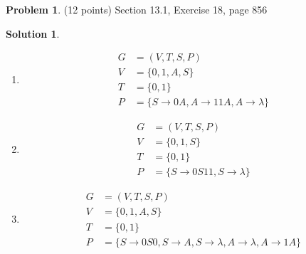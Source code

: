 \documentclass{article}
\theoremstyle{definition}
\newtheorem{problem}{Problem}
\newtheorem*{solution}{Solution}
\begin{document}
\begin{problem} (12 points)
Section 13.1, Exercise 18, page 856
\end{problem}
\begin{solution} \ \\
\begin{enumerate}
    \item
    \begin{align*}
      G &= (V,T,S,P) \\
      V &= \{0,1,A,S\} \\
      T &= \{0,1\} \\
      P &= \{S \rightarrow 0A, A \rightarrow 11A, A \rightarrow \lambda \}
    \end{align*}

    \item
    \begin{align*}
      G &= (V,T,S,P) \\
      V &= \{0,1,S\} \\
      T &= \{0,1\} \\
      P &= \{S \rightarrow 0S11, S \rightarrow \lambda \}
    \end{align*}
    \item
    \begin{align*}
      G &= (V,T,S,P) \\
      V &= \{0,1,A,S\} \\
      T &= \{0,1\} \\
      P &= \{S \rightarrow 0S0, S \rightarrow A, S \rightarrow \lambda, A \rightarrow \lambda, A \rightarrow 1A\}
    \end{align*}

\end{enumerate}
\end{solution}
\end{document}
